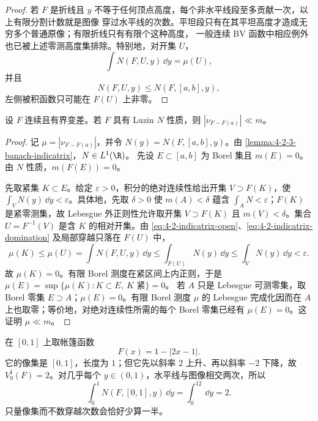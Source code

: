 \begin{proof}
若 $F$ 是折线且 $y$ 不等于任何顶点高度，每个非水平线段至多贡献一次，以上有限分割计数就是图像
穿过水平线的次数。平坦段只有在其平坦高度才造成无穷多个普通原像；有限折线只有有限个这种高度，
一般连续 BV 函数中相应例外也已被上述零测高度集排除。特别地，对开集 $U$，
\begin{equation}\label{eq:4-2-indicatrix-open}
 \int N(F,U,y)\,\dd y=\mu(U),
\end{equation}
并且
\begin{equation}\label{eq:4-2-indicatrix-domination}
 N(F,U,y)\le N(F,[a,b],y),
\end{equation}
左侧被积函数只可能在 $F(U)$ 上非零。
\end{proof}

\begin{lemma}[连续 BV 的变差--$N$ 引理]\label{lemma:4-2-3-variation-N}
设 $F$ 连续且有界变差。若 $F$ 具有 Luzin $N$ 性质，则
$|\nu_{F-F(a)}|\ll m$。
\end{lemma}

\begin{proof}
记 $\mu=|\nu_{F-F(a)}|$，并令
$N(y)=N(F,[a,b],y)$。由
\cref{lemma:4-2-3-banach-indicatrix}，$N\in L^1(\R)$。
先设 $E\subset[a,b]$ 为 Borel 集且 $m(E)=0$。由 $N$ 性质，$m(F(E))=0$。

先取紧集 $K\subset E$。给定 $\varepsilon>0$，积分的绝对连续性给出开集
$V\supset F(K)$，使 $\int_VN(y)\,\dd y<\varepsilon$。具体地，先取
$\delta>0$ 使 $m(A)<\delta$ 蕴含 $\int_A N<\varepsilon$；$F(K)$ 是紧零测集，故
Lebesgue 外正则性允许取开集 $V\supset F(K)$ 且 $m(V)<\delta$。集合
$U=F^{-1}(V)$ 是含 $K$ 的相对开集。由
\eqref{eq:4-2-indicatrix-open}、\eqref{eq:4-2-indicatrix-domination} 及局部穿越只落在 $F(U)$ 中，
\[
 \mu(K)\le\mu(U)
 =\int N(F,U,y)\,\dd y
 \le\int_{F(U)}N(y)\,\dd y
 \le\int_VN(y)\,\dd y<\varepsilon.
\]
故 $\mu(K)=0$。有限 Borel 测度在紧区间上内正则，于是
$\mu(E)=\sup\{\mu(K):K\subset E,\ K\text{ 紧}\}=0$。
若 $A$ 只是 Lebesgue 可测零集，取 Borel 零集 $E\supset A$；$\mu(E)=0$。有限 Borel 测度
$\mu$ 的 Lebesgue 完成化因而在 $A$ 上也取零；等价地，对绝对连续性所需的每个 Borel 零集已经有
$\mu(E)=0$。这证明 $\mu\ll m$。
\end{proof}

\begin{example}[重数不能删掉]\label{ex:4-2-3-indicatrix}
在 $[0,1]$ 上取帐篷函数
\[
 F(x)=1-|2x-1|.
\]
它的像集是 $[0,1]$，长度为 $1$；但它先以斜率 $2$ 上升、再以斜率 $-2$ 下降，故
$V_0^1(F)=2$。对几乎每个 $y\in(0,1)$，水平线与图像相交两次，所以
\[
 \int_0^1N(F,[0,1],y)\,\dd y=\int_0^12\,\dd y=2.
\]
只量像集而不数穿越次数会恰好少算一半。
\end{example}

